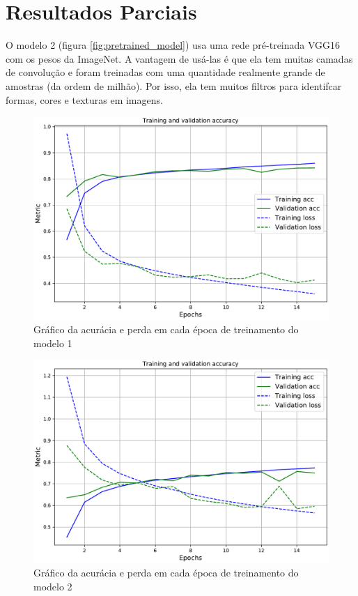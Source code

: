 \section*{Resultados Parciais}
O modelo 2 (figura \ref{fig:pretrained_model}) usa uma rede pré-treinada VGG16 com os pesos da ImageNet. A vantagem de usá-las é que ela tem muitas camadas de convolução e foram treinadas com uma quantidade realmente grande de amostras (da ordem de milhão). Por isso, ela tem muitos filtros para identifcar formas, cores e texturas em imagens.

\pagebreak
\begin{figure}[h!]
  \centering
  \includegraphics[width=.78\textwidth]{figures/conv_train.pdf}
  \caption{Gráfico da acurácia e perda em cada época de treinamento do modelo 1}
  \label{fig:conv_train}
\end{figure}

\begin{figure}[h!]
  \centering
  \includegraphics[width=.78\textwidth]{figures/pretrained_train.pdf}
  \caption{Gráfico da acurácia e perda em cada época de treinamento do modelo 2}
  \label{fig:pretrained_train}
\end{figure}